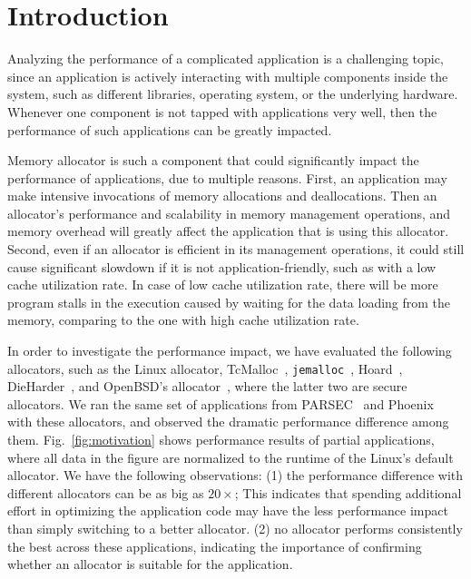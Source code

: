 

\section{Introduction}

Analyzing the performance of a complicated application is a challenging topic, since an application is actively interacting with multiple components inside the system, such as different libraries, operating system, or the underlying hardware. Whenever one component is not tapped with applications very well, then the performance of such applications can be greatly impacted. 

Memory allocator is such a component that could significantly impact the performance of applications, due to multiple reasons. First, an application may make intensive invocations of memory allocations and deallocations. Then an allocator's performance and scalability in memory management operations, and memory overhead will greatly affect the application that is using this allocator. Second, even if an allocator is efficient in its management operations, it could still cause significant slowdown if it is not application-friendly, such as with a low cache utilization rate. In case of low cache utilization rate, there will be more program stalls in the execution caused by waiting for the data loading from the memory, comparing to the one with high cache utilization rate.  


In order to investigate the performance impact, we have evaluated the following allocators, such as the Linux allocator, TcMalloc~\citep{TCMalloc}, \texttt{jemalloc}~\citep{jemalloc}, Hoard~\citep{Hoard}, DieHarder~\citep{DieHarder}, and OpenBSD's allocator~\citep{openbsd}, where the latter two are secure allocators. We ran the same set of applications from PARSEC~\citep{parsec} and Phoenix~\citep{phoenix} with these allocators, and observed the dramatic performance difference among them. Fig.~\ref{fig:motivation} shows performance results of partial applications, where all data in the figure are normalized to the runtime of the Linux's default allocator. We have the following observations: (1) the performance difference with different allocators can be as big as $20\times$; This indicates that spending additional effort in optimizing the application code may have the less performance impact than simply switching to a better allocator. (2) no allocator performs consistently the best across these applications, indicating the importance of confirming whether an allocator is suitable for the application. 

